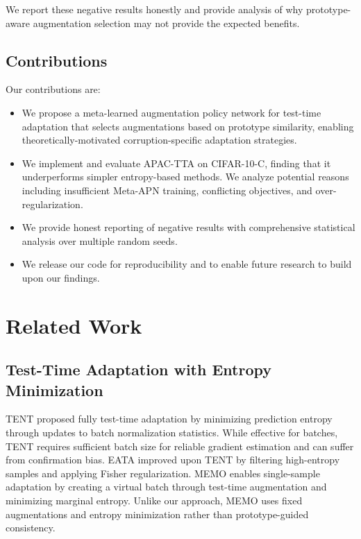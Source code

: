 \documentclass{article}
\begin{document}
We report these negative results honestly and provide analysis of why prototype-aware augmentation selection may not provide the expected benefits.

\subsection{Contributions}

Our contributions are:
\begin{itemize}
    \item We propose a meta-learned augmentation policy network for test-time adaptation that selects augmentations based on prototype similarity, enabling theoretically-motivated corruption-specific adaptation strategies.
    \item We implement and evaluate APAC-TTA on CIFAR-10-C, finding that it underperforms simpler entropy-based methods. We analyze potential reasons including insufficient Meta-APN training, conflicting objectives, and over-regularization.
    \item We provide honest reporting of negative results with comprehensive statistical analysis over multiple random seeds.
    \item We release our code for reproducibility and to enable future research to build upon our findings.
\end{itemize}

\section{Related Work}

\subsection{Test-Time Adaptation with Entropy Minimization}

TENT \citep{wang2021tent} proposed fully test-time adaptation by minimizing prediction entropy through updates to batch normalization statistics. While effective for batches, TENT requires sufficient batch size for reliable gradient estimation and can suffer from confirmation bias. EATA \citep{niu2022efficient} improved upon TENT by filtering high-entropy samples and applying Fisher regularization. MEMO \citep{zhang2022memo} enables single-sample adaptation by creating a virtual batch through test-time augmentation and minimizing marginal entropy. Unlike our approach, MEMO uses fixed augmentations and entropy minimization rather than prototype-guided consistency.
\end{document}
